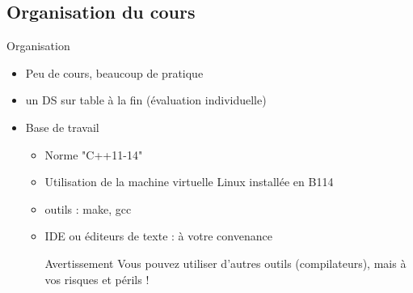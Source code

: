 \subsection{Organisation du cours}

\begin{frame}{Organisation}
\begin{itemize}
\item Peu de cours, beaucoup de pratique
\item un DS sur table à la fin (évaluation individuelle)
\item Base de travail
\begin{itemize}
\item Norme "C++11-14"
\item Utilisation de la machine virtuelle Linux installée en B114
\item outils : make, gcc
\item IDE ou éditeurs de texte : à votre convenance
\begin{alertblock}{Avertissement}
Vous pouvez utiliser d'autres outils (compilateurs), mais à vos risques et périls !
\end{alertblock}
\end{itemize}
\end{itemize}
\end{frame}
